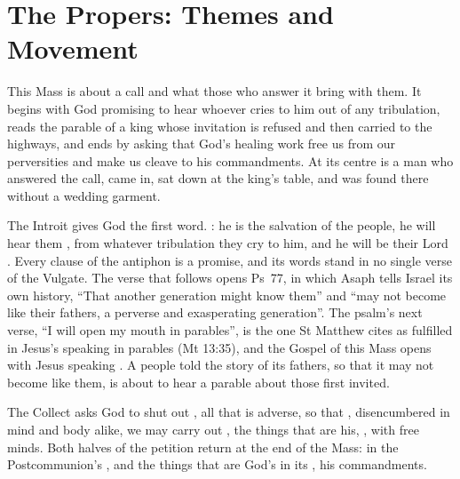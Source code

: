 
\section{The Propers: Themes and Movement}

This Mass is about a call and what those who answer it bring with them. It
begins with God promising to hear whoever cries to him out of any tribulation,
reads the parable of a king whose invitation is refused and then carried to the
highways, and ends by asking that God's healing work free us from our
perversities and make us cleave to his commandments. At its centre is a man who
answered the call, came in, sat down at the king's table, and was found there
without a wedding garment.

The Introit gives God the first word. : he is the salvation of the people, he will hear them , from whatever tribulation they cry to him, and he will
be their Lord . Every clause of the antiphon is a promise,
and its words stand in no single verse of the Vulgate. The verse that follows
opens Ps~77, in which Asaph tells Israel its own history, ``That another
generation might know them'' and ``may not become like their fathers, a perverse
and exasperating generation''. The psalm's next verse, ``I will open my mouth in
parables'', is the one St Matthew cites as fulfilled in Jesus's speaking in
parables (Mt 13:35), and the Gospel of this Mass opens with Jesus speaking
. A people told the story of its fathers, so that it may
not become like them, is about to hear a parable about those first invited.

The Collect asks God to shut out , all that is
adverse, so that , disencumbered in
mind and body alike, we may carry out , the things that are
his, , with free minds. Both halves of the petition return
at the end of the Mass:  in the Postcommunion's
, and the things that are God's in its , his commandments.

